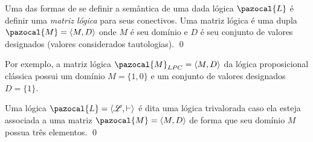\begin{definicao}
    Uma das formas de se definir a semântica de uma dada lógica $\pazocal{L}$ é definir uma \textit{matriz lógica} para seus conectivos. Uma matriz lógica é uma dupla $\pazocal{M} = \langle M, D \rangle$ onde $M$ é seu domínio e $D$ é seu conjunto de valores designados (valores considerados tautologias). \qed{}
\end{definicao}
Por exemplo, a matriz lógica $\pazocal{M}_{LPC} = \langle M, D \rangle$ da lógica proposicional clássica possui um domínio $M = \{1, 0\}$ e um conjunto de valores designados $D = \{1\}$.
\begin{definicao}
    Uma  lógica $\pazocal{L} = \langle \mathcal{L}, \vdash \rangle$ é dita uma lógica trivalorada caso ela esteja associada a uma matriz $\pazocal{M} = \langle M, D \rangle$ de forma que seu domínio $M$ possua três elementos.
    \qed{}
\end{definicao}

